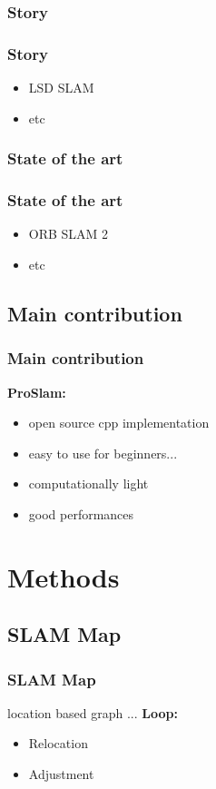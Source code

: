 \documentclass[16pt]{beamer}
\begin{document}
\subsubsection*{Story}
\begin{frame}
  \frametitle{Story}
  \begin{itemize}
  \item LSD SLAM
  \item etc
  \end{itemize}

\end{frame}
\subsubsection*{State of the art }
\begin{frame}
  \frametitle{State of the art}
  \begin{itemize}
  \item ORB SLAM 2
  \item etc
  \end{itemize}
\end{frame}


\subsection{Main contribution}
\begin{frame}
  \frametitle{Main contribution}
  \textbf{ ProSlam: } \\
  \begin{itemize}
  \item open source cpp implementation
  \item easy to use for beginners...
  \item computationally light
  \item good performances
  \end{itemize}
\end{frame}


\section{ Methods }
\subsection*{SLAM Map}
\begin{frame}
  \frametitle{SLAM Map}

  location based graph ...
  \textbf{ Loop: } \\
  \begin{itemize}
  \item Relocation
  \item Adjustment
  \end{itemize}
\end{frame}
\end{document}

